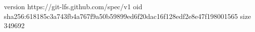 version https://git-lfs.github.com/spec/v1
oid sha256:618185c3a743fb4a767f9a50b59899ed6f20dac16f128edf2e8e47f198001565
size 349692

